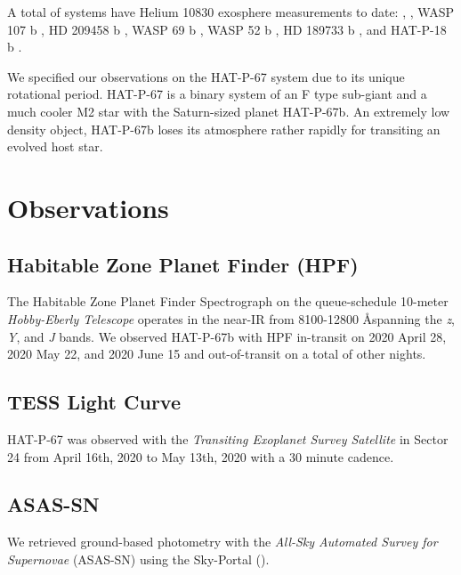 \documentclass[modern]{aastex631}
\begin{document}
A total of  systems have Helium 10830 exosphere measurements to date:  \citep{2020ApJ...894...97N, 2021A&A...647A.129L},  \citep{2022AJ....163...68Z}, WASP 107 b \citep{2019A&A...623A..58A,2020AJ....159..115K}, HD 209458 b \citep{2019A&A...629A.110A}, WASP 69 b \citep{2020AJ....159..278V}, WASP 52 b \citep{2020AJ....159..278V}, HD 189733 b \citep{2021A&A...647A.129L}, and HAT-P-18 b \citep{2021ApJ...909L..10P}.


We specified our observations on the HAT-P-67 system due to its unique rotational period. HAT-P-67 is a binary system of an F type sub-giant and a much cooler M2 star with the Saturn-sized planet HAT-P-67b. An extremely low density object, HAT-P-67b loses its atmosphere rather rapidly for transiting an evolved host star.

\section{Observations}
\subsection{Habitable Zone Planet Finder (HPF)}

The Habitable Zone Planet Finder Spectrograph \citep[HPF][]{2012SPIE.8446E..1SM,2014SPIE.9147E..1GM, 2019Optic...6..233M} on the queue-schedule 10-meter \emph{Hobby-Eberly Telescope} \citep[HET][]{1998SPIE.3352...34R, 2007PASP..119..556S} operates in the near-IR from 8100-12800 \AA spanning the \textit{z}, \textit{Y}, and \textit{J} bands. We observed HAT-P-67b with HPF in-transit on 2020 April 28, 2020 May 22, and 2020 June 15 and out-of-transit on a total of  other nights.

% 

\subsection{TESS Light Curve}
HAT-P-67 was observed with the \emph{Transiting Exoplanet Survey Satellite} \citep[TESS][]{2014SPIE.9143E..20R} in Sector 24 from April 16th, 2020 to May 13th, 2020 with a 30 minute cadence.

\subsection{ASAS-SN}
We retrieved ground-based photometry with the \emph{All-Sky Automated Survey for Supernovae} (ASAS-SN) using the Sky-Portal ().
\end{document}
